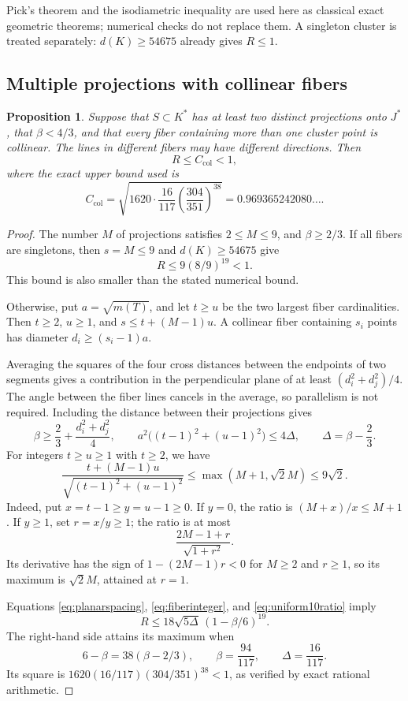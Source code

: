 \documentclass[11pt,a4paper]{article}
\newtheorem{proposition}[theorem]{Proposition}
\theoremstyle{remark}\newtheorem{remark}[theorem]{Remark}
\begin{document}
Pick's theorem and the isodiametric inequality are used here as classical exact geometric theorems; numerical checks do not replace them. A singleton cluster is treated separately: $d(K)\ge54675$ already gives $R\le1$.

\subsection{Multiple projections with collinear fibers}

\begin{proposition}\label{prop:collinear10}
Suppose that $S\subset K^*$ has at least two distinct projections onto $J^*$, that $\beta<4/3$, and that every fiber containing more than one cluster point is collinear. The lines in different fibers may have different directions. Then
\[
R\le C_{\mathrm{col}}<1,
\]
where the exact upper bound used is
\[
C_{\mathrm{col}}=\sqrt{1620\cdot\frac{16}{117}
\left(\frac{304}{351}\right)^{38}}
=0.969365242080\ldots.
\]
\end{proposition}

\begin{proof}
The number $M$ of projections satisfies $2\le M\le9$, and $\beta\ge2/3$. If all fibers are singletons, then $s=M\le9$ and $d(K)\ge54675$ give
\[
R\le9(8/9)^{19}<1.
\]
This bound is also smaller than the stated numerical bound.

Otherwise, put $a=\sqrt{m(T)}$, and let $t\ge u$ be the two largest fiber cardinalities. Then $t\ge2$, $u\ge1$, and $s\le t+(M-1)u$. A collinear fiber containing $s_i$ points has diameter $d_i\ge(s_i-1)a$.

Averaging the squares of the four cross distances between the endpoints of two segments gives a contribution in the perpendicular plane of at least $(d_i^2+d_j^2)/4$. The angle between the fiber lines cancels in the average, so parallelism is not required. Including the distance between their projections gives
\[
\beta\ge\frac23+\frac{d_i^2+d_j^2}{4},\qquad
a^2\big((t-1)^2+(u-1)^2\big)\le4\Delta,\qquad
\Delta=\beta-\frac23.
\]
For integers $t\ge u\ge1$ with $t\ge2$, we have
\begin{equation}\label{eq:fiberinteger}
\frac{t+(M-1)u}{\sqrt{(t-1)^2+(u-1)^2}}
\le\max(M+1,\sqrt2M)\le9\sqrt2.
\end{equation}
Indeed, put $x=t-1\ge y=u-1\ge0$. If $y=0$, the ratio is $(M+x)/x\le M+1$. If $y\ge1$, set $r=x/y\ge1$; the ratio is at most
\[
\frac{2M-1+r}{\sqrt{1+r^2}}.
\]
Its derivative has the sign of $1-(2M-1)r<0$ for $M\ge2$ and $r\ge1$, so its maximum is $\sqrt2M$, attained at $r=1$.

Equations \eqref{eq:planarspacing}, \eqref{eq:fiberinteger}, and \eqref{eq:uniform10ratio} imply
\[
R\le18\sqrt{5\Delta}\,(1-\beta/6)^{19}.
\]
The right-hand side attains its maximum when
\[
6-\beta=38(\beta-2/3),\qquad
\beta=\frac{94}{117},\qquad \Delta=\frac{16}{117}.
\]
Its square is $1620(16/117)(304/351)^{38}<1$, as verified by exact rational arithmetic.
\end{proof}
\end{document}
